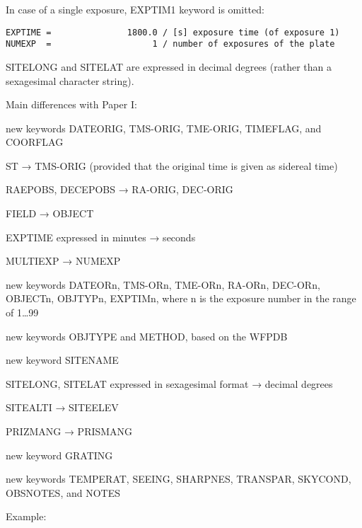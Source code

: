 \documentclass[11pt]{ivoa}
\begin{document}
In case of a single exposure, EXPTIM1 keyword is omitted:

\begin{lstlisting}
EXPTIME =               1800.0 / [s] exposure time (of exposure 1)
NUMEXP  =                    1 / number of exposures of the plate
\end{lstlisting}

SITELONG and SITELAT are expressed in decimal degrees (rather than a
sexagesimal character string).

Main differences with Paper I:

new keywords DATEORIG, TMS-ORIG, TME-ORIG, TIMEFLAG, and COORFLAG

ST → TMS-ORIG (provided that the original time is given as sidereal time)

RAEPOBS, DECEPOBS → RA-ORIG, DEC-ORIG

FIELD → OBJECT

EXPTIME expressed in minutes → seconds

MULTIEXP → NUMEXP

new keywords DATEORn, TMS-ORn, TME-ORn, RA-ORn, DEC-ORn, OBJECTn, OBJTYPn, EXPTIMn, where n is the exposure number in the range of 1…99

new keywords OBJTYPE and METHOD, based on the WFPDB

new keyword SITENAME

SITELONG, SITELAT expressed in sexagesimal format → decimal degrees

SITEALTI → SITEELEV

PRIZMANG → PRISMANG

new keyword GRATING

new keywords TEMPERAT, SEEING, SHARPNES, TRANSPAR, SKYCOND, OBSNOTES, and NOTES

Example:
\end{document}
